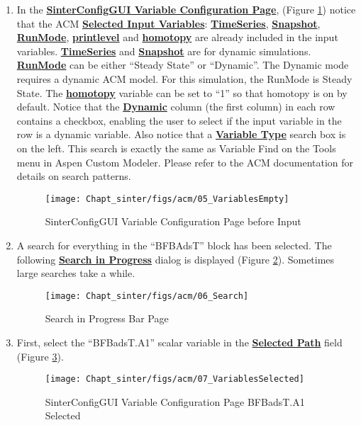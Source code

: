 \begin{enumerate}
\item In the \textbf{\underline{SinterConfigGUI Variable Configuration Page}}, (Figure \ref{fig.sinter.acm.variableempty}) notice that the ACM \textbf{\underline{Selected Input Variables}}: \textbf{\underline{TimeSeries}}, \textbf{\underline{Snapshot}}, \textbf{\underline{RunMode}}, \textbf{\underline{printlevel}} and \textbf{\underline{homotopy}} are already included in the input variables.  \textbf{\underline{TimeSeries}} and \textbf{\underline{Snapshot}} are for dynamic simulations. \textbf{\underline{RunMode}} can be either ``Steady State'' or ``Dynamic''. The Dynamic mode requires a dynamic ACM model. For this simulation, the RunMode is Steady State. The \textbf{\underline{homotopy}} variable can be set to ``1'' so that homotopy is on by default.  Notice that the \textbf{\underline{Dynamic}} column (the first column) in each row contains a checkbox, enabling the user to select if the input variable in the row is a dynamic variable.  Also notice that a \textbf{\underline{Variable Type}} search box is on the left. This search is exactly the same as Variable Find on the Tools menu in Aspen Custom Modeler. Please refer to the ACM documentation for details on search patterns.
\begin{figure}[H]
	\begin{center}
		\texttt{[image: Chapt\_sinter/figs/acm/05\_VariablesEmpty]}
		\caption{SinterConfigGUI Variable Configuration Page before Input}
		\label{fig.sinter.acm.variableempty}
	\end{center}
\end{figure}

\item A search for everything in the ``BFBAdsT'' block has been
  selected. The following \textbf{\underline{Search in Progress}}
  dialog is displayed (Figure \ref{fig.sinter.acm.variableprogress}). Sometimes large searches take a while.
\begin{figure}[H]
	\begin{center}
		\texttt{[image: Chapt\_sinter/figs/acm/06\_Search]}
		\caption{Search in Progress Bar Page}
		\label{fig.sinter.acm.variableprogress}
	\end{center}
\end{figure}

\item First, select the ``BFBadsT.A1'' scalar variable in the \textbf{\underline{Selected Path}} field (Figure \ref{fig.sinter.acm.variableselected}).
\begin{figure}[H]
	\begin{center}
		\texttt{[image: Chapt\_sinter/figs/acm/07\_VariablesSelected]}
		\caption{SinterConfigGUI Variable Configuration Page BFBadsT.A1 Selected}
		\label{fig.sinter.acm.variableselected}
	\end{center}
\end{figure}


\end{enumerate}
